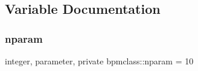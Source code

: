 \subsection{Variable Documentation}
\mbox{\label{namespacebpmclass_ac2f2f373976236d08c9c68de895950eb}} 
\subsubsection{\texorpdfstring{nparam}{nparam}}
{\footnotesize\ttfamily integer, parameter, private bpmclass\+::nparam = 10\hspace{0.3cm}{\ttfamily [private]}}

